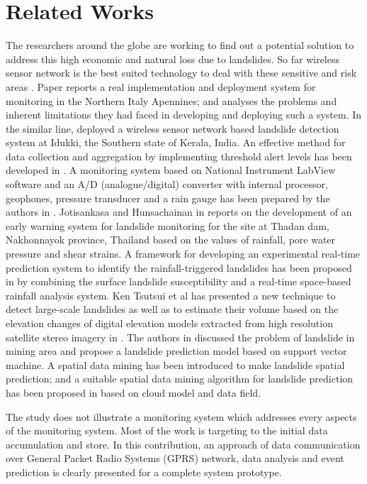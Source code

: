 \documentclass[conference]{IEEEtran}
\begin{document}
\section{Related Works}
The researchers around the globe are working to find out a potential solution to address this high economic and natural
loss due to landslides. So far wireless sensor network is the best suited technology to deal with these sensitive and risk areas \cite{akyildiz} \cite{sahoo2012}. Paper \cite{yang} reports a real implementation and deployment system for monitoring in the Northern Italy Apennines; and analyses the problems and inherent limitations they had faced in developing and deploying such a system. In the similar line, \cite{zan} deployed a wireless sensor network based landslide detection system at Idukki, the Southern state of Kerala, India. An effective method for data collection and aggregation by implementing threshold alert levels has been developed in \cite{maneesha}. A monitoring system based on National
Instrument LabView software and an A/D (analogue/digital) converter with internal processor, geophones, pressure transducer and a rain gauge has been prepared by the authors in \cite{fausto}. Jotisankasa and Hunsachainan in \cite{jotisankasa} reports on the development of an early warning system for landslide monitoring for the site at Thadan dam, Nakhonnayok province, Thailand based on the values of rainfall, pore water pressure and shear strains. A framework for developing an experimental real-time prediction system to identify the rainfall-triggered landslides has been proposed in \cite{lodhi} by combining the surface landslide susceptibility and a real-time space-based rainfall analysis system. Ken Tsutsui et al has presented a new technique to detect large-scale landslides as well as to estimate their volume based on the elevation changes of digital elevation models extracted from high resolution satellite stereo imagery in \cite{richard}.
The authors in \cite{xianguo} discussed the problem of landslide in mining area and propose a landslide prediction model based on support vector machine. A spatial data mining has been introduced to make landslide spatial prediction; and a suitable spatial data mining algorithm for landslide prediction has been proposed in \cite{gaelle} based on cloud model and data field.
\par
The study does not illustrate a monitoring system which addresses every aspects of the monitoring system. Most of the
work is targeting to the initial data accumulation and store. In this contribution, an approach of data communication over
General Packet Radio Systems (GPRS) network, data analysis and event prediction is clearly presented for a complete system prototype.
\end{document}
